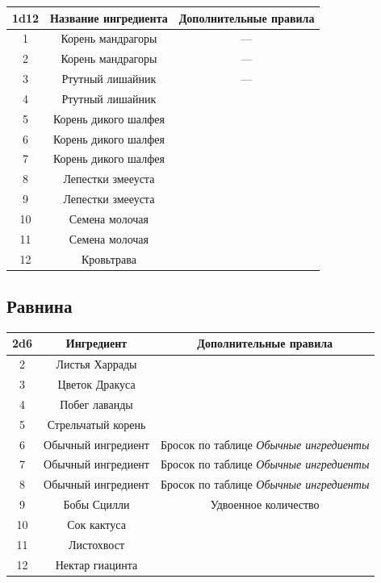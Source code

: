 \documentclass[a4paper, 9pt, twocolumn]{book}
\begin{document}
	\begin{tabular}{|c|c|c|}
		\hline
		\textbf{1d12}& Название ингредиента & Дополнительные правила \\
		\hline
		1 & Корень мандрагоры & --- \\
		\hline
		2 & Корень мандрагоры & --- \\
		\hline
		3 & Ртутный лишайник & --- \\
		\hline
		4 & Ртутный лишайник &  \\
		\hline
		5 & Корень дикого шалфея &  \\
		\hline
		6 & Корень дикого шалфея &  \\
		\hline
		7 & Корень дикого шалфея &  \\
		\hline
		8 & Лепестки змееуста &  \\
		\hline
		9 & Лепестки змееуста &  \\
		\hline
		10 & Семена молочая &  \\
		\hline
		11 & Семена молочая &  \\
		\hline
		12 & Кровьтрава &  \\ %
		\hline
	\end{tabular}
	
	\subsection{Равнина}
	
	\begin{tabular}{|c|c|c|}
		\hline
		\textbf{2d6} & \textbf{Ингредиент} & \textbf{Дополнительные правила} \\
		\hline
		2 & Листья Харрады &  \\
		\hline
		3 & Цветок Дракуса &  \\
		\hline
		4 & Побег лаванды &  \\
		\hline
		5 & Стрельчатый корень &  \\
		\hline
		6 & Обычный ингредиент & Бросок по таблице \textit{Обычные ингредиенты} \\
		\hline
		7 & Обычный ингредиент & Бросок по таблице \textit{Обычные ингредиенты} \\
		\hline
		8 & Обычный ингредиент & Бросок по таблице \textit{Обычные ингредиенты} \\
		\hline
		9 & Бобы Сцилли & Удвоенное количество \\
		\hline
		10 & Сок кактуса &  \\
		\hline
		11 & Листохвост &  \\
		\hline
		12 & Нектар гиацинта &  \\
		\hline
	\end{tabular}
\end{document}
